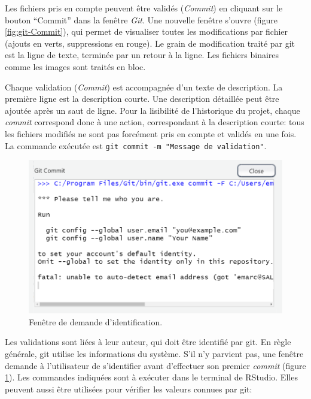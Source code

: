 \documentclass[
  12pt,
  french,
  a4paper,
  extrafontsizes,onecolumn,openright
  ]{memoir}
\begin{document}
\normalsize

Les fichiers pris en compte peuvent être validés (\emph{Commit}) en cliquant sur le bouton \enquote{Commit} dans la fenêtre \emph{Git}.
Une nouvelle fenêtre s'ouvre (figure \ref{fig:git-Commit}), qui permet de visualiser toutes les modifications par fichier (ajouts en verts, suppressions en rouge).
Le grain de modification traité par git est la ligne de texte, terminée par un retour à la ligne.
Les fichiers binaires comme les images sont traités en bloc.

Chaque validation (\emph{Commit}) est accompagnée d'un texte de description.
La première ligne est la description courte.
Une description détaillée peut être ajoutée après un saut de ligne.
Pour la lisibilité de l'historique du projet, chaque \emph{commit} correspond donc à une action, correspondant à la description courte: tous les fichiers modifiés ne sont pas forcément pris en compte et validés en une fois.
La commande exécutée est \texttt{git\ commit\ -m\ "Message\ de\ validation"}.



\scriptsize

\begin{figure}

{\centering \includegraphics[width=0.8\linewidth]{images/git-id} 

}

\caption{Fenêtre de demande d'identification.}\label{fig:git-id}
\end{figure}

\normalsize

Les validations sont liées à leur auteur, qui doit être identifié par git.
En règle générale, git utilise les informations du système.
S'il n'y parvient pas, une fenêtre demande à l'utilisateur de s'identifier avant d'effectuer son premier \emph{commit} (figure \ref{fig:git-id}).
Les commandes indiquées sont à exécuter dans le terminal de RStudio.
Elles peuvent aussi être utilisées pour vérifier les valeurs connues par git:
\end{document}
